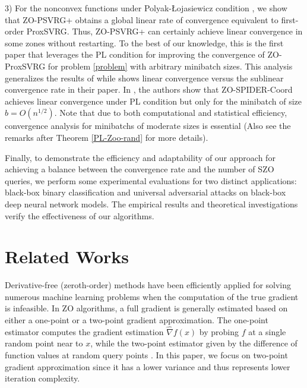 3) For the nonconvex functions under Polyak-Łojasiewicz condition \cite{polyak1963gradient}, we show that ZO-PSVRG+
obtains a global linear rate of convergence  equivalent to first-order ProxSVRG. Thus, ZO-PSVRG+ can certainly achieve linear convergence in some zones without restarting. To the best of
our knowledge, this is the first paper that leverages the PL condition for improving the convergence of ZO-ProxSVRG for problem \eqref{problem} with arbitrary minibatch sizes. This analysis generalizes the results of \cite{duchi2015optimal} while  shows linear convergence versus the sublinear convergence rate in their paper.
In \cite{ji2019improved}, the authors show that  ZO-SPIDER-Coord achieves linear convergence under PL condition but only for the minibatch of size $b = O(n^{1/2})$. Note that due to both computational and statistical efficiency, convergence analysis for minibatchs of moderate sizes is essential (Also see the remarks after Theorem \ref{PL-Zoo-rand} for more details). 

Finally, to demonstrate the efficiency and adaptability of our approach for achieving a balance between the convergence rate and the number of SZO queries, we perform some
experimental evaluations for two distinct applications: black-box binary classification and universal adversarial
attacks on black-box deep neural network models. The empirical results and
theoretical investigations verify the effectiveness of our algorithms.

\section{Related Works}
Derivative-free (zeroth-order) methods have been efficiently applied for solving numerous machine learning problems when the computation of the true gradient is infeasible. In ZO algorithms, a full gradient is generally estimated based on either a one-point or a two-point gradient approximation. The one-point estimator computes the gradient estimation $\hat{\nabla} f(x)$ by probing $f$ at a single random point near to $x$,   while the two-point estimator given by the difference of function values at random
query points \cite{agarwal2010optimal,nesterov2017random}. In this paper, we focus on two-point gradient approximation since it has a lower variance and thus represents lower iteration complexity.

